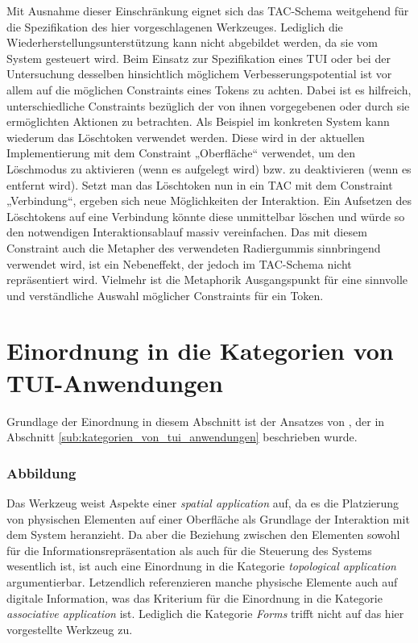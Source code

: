 Mit Ausnahme dieser Einschränkung eignet sich das \gls{TAC}-Schema weitgehend für die Spezifikation des hier vorgeschlagenen Werkzeuges. Lediglich die Wiederherstellungsunterstützung kann nicht abgebildet werden, da sie vom System gesteuert wird. Beim Einsatz zur Spezifikation eines \gls{TUI} oder bei der Untersuchung desselben hinsichtlich möglichem Verbesserungspotential ist vor allem auf die möglichen Constraints eines Tokens zu achten. Dabei ist es hilfreich, unterschiedliche Constraints bezüglich der von ihnen vorgegebenen oder durch sie ermöglichten Aktionen zu betrachten. Als Beispiel im konkreten System kann wiederum das Löschtoken verwendet werden. Diese wird in der aktuellen Implementierung mit dem Constraint „Oberfläche“ verwendet, um den Löschmodus zu aktivieren (wenn es aufgelegt wird) bzw. zu deaktivieren (wenn es entfernt wird). Setzt man das Löschtoken nun in ein \gls{TAC} mit dem Constraint „Verbindung“, ergeben sich neue Möglichkeiten der Interaktion. Ein Aufsetzen des Löschtokens auf eine Verbindung könnte diese unmittelbar löschen und würde so den notwendigen Interaktionsablauf massiv vereinfachen. Das mit diesem Constraint auch die Metapher des verwendeten Radiergummis sinnbringend verwendet wird, ist ein Nebeneffekt, der jedoch im \gls{TAC}-Schema nicht repräsentiert wird. Vielmehr ist die Metaphorik Ausgangspunkt für eine sinnvolle und verständliche Auswahl möglicher Constraints für ein Token.


\section{Einordnung in die Kategorien von TUI-Anwendungen} %
\label{sec:einordnung_in_die_kategorien_von_tui_anwendungen}

Grundlage der Einordnung in diesem Abschnitt ist der Ansatzes von \citep{Klemmer04}, der in Abschnitt \ref{sub:kategorien_von_tui_anwendungen} beschrieben wurde.

\subsubsection{Abbildung}

Das Werkzeug weist Aspekte einer \emph{spatial application} auf, da es die Platzierung von physischen Elementen auf einer Oberfläche als Grundlage der Interaktion mit dem System heranzieht. Da aber die Beziehung zwischen den Elementen sowohl für die Informationsrepräsentation als auch für die Steuerung des Systems wesentlich ist, ist auch eine Einordnung in die Kategorie \emph{topological application} argumentierbar. Letzendlich referenzieren manche physische Elemente auch auf digitale Information, was das Kriterium für die Einordnung in die Kategorie \emph{associative application} ist. Lediglich die Kategorie \emph{Forms} trifft nicht auf das hier vorgestellte Werkzeug zu. 

